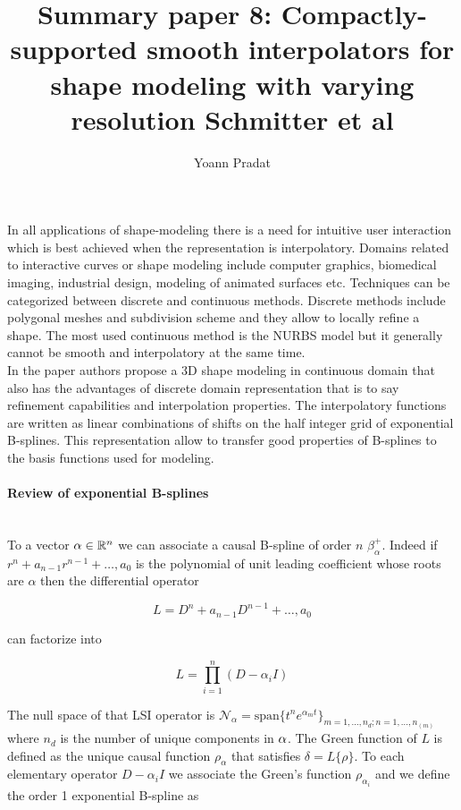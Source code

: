 \documentclass[a4paper, 11pt]{article}
\begin{document}
\title{Summary paper 8: Compactly-supported smooth interpolators for shape modeling with varying resolution Schmitter et 
al}
\author{Yoann Pradat}
\maketitle

In all applications of shape-modeling there is a need for intuitive user interaction which is best achieved when the 
representation is interpolatory. Domains related to interactive curves or shape modeling include computer graphics, 
biomedical imaging, industrial design, modeling of animated surfaces etc. Techniques can be categorized between discrete 
and continuous methods. Discrete methods include polygonal meshes and subdivision scheme and they allow to locally 
refine a shape.  The most used continuous method is the NURBS model but it generally cannot be smooth and interpolatory 
at the same time. \\ 

In the paper authors propose a 3D shape modeling in continuous domain that also has the advantages of discrete domain 
representation that is to say refinement capabilities and interpolation properties. The interpolatory functions are 
written as linear combinations of shifts on the half integer grid of exponential B-splines. This representation allow to 
transfer good properties of B-splines to the basis functions used for modeling. 

\paragraph{Review of exponential B-splines} \mbox{} \\
 
To a vector ${\bf \alpha} \in \mathbb{R}^n$ we can associate a causal B-spline of order $n$ $\beta^+_{\alpha}$. Indeed
if $r^n + a_{n-1}r^{n-1} + \ldots, a_{0}$ is the polynomial of unit leading coefficient whose roots are $\alpha$ then 
the differential operator

\begin{equation}
  L = D^n + a_{n-1}D^{n-1} + \ldots, a_{0}
\end{equation}

can factorize into 

\begin{equation}
  L = \prod_{i=1}^n (D-\alpha_i I)
\end{equation}

The null space of that LSI operator is $\mathcal{N}_{\alpha} = \text{span}{\{t^n e^{\alpha_{m}t}\}}_{m=1, \ldots, n_d ; 
n=1, \ldots, n_{(m)}}$ where $n_d$ is the number of unique components in ${\bf \alpha}$. The Green function of $L$ is 
defined as the unique causal function $\rho_{\alpha}$ that satisfies $\delta = L\{\rho\}$. To each elementary operator 
$D - \alpha_i I$ we associate the Green's function $\rho_{\alpha_i}$ and we define the order 1 exponential B-spline as 
\end{document}
